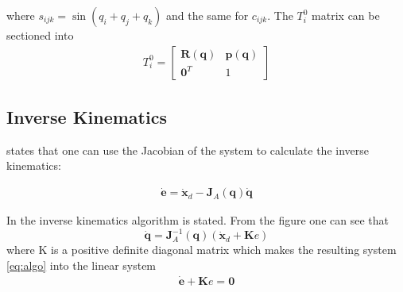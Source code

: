 where $s_{ijk} = \sin{(q_i + q_j + q_k)}$ and the same for $c_{ijk}$. The $T_i^0$ matrix can be sectioned into \begin{align*}
 T_i^0 = 
    \begin{bmatrix}
        \bm{R}(\bm{q}) & \bm{p}(\bm{q})\\
        \bm{0}^T & 1
    \end{bmatrix}    
\end{align*}

\subsection*{Inverse Kinematics}
\cite{Siciliano} states that one can use the Jacobian of the system to calculate the inverse kinematics:

\begin{align}\label{eq:algo}
\dot{\bm{e}} = \dot{\bm{x}}_d - \bm{J}_A(\bm{q})\dot{\bm{q}}
\end{align}

In  the inverse kinematics algorithm is stated. From the figure one can see that 
$$
\dot{\bm{q}} = \bm{J}_A^{-1}(\bm{q})(\dot{\bm{x}}_d + \bm{K}e)
$$
where K is a positive definite diagonal matrix which makes the resulting system \eqref{eq:algo} into the linear system
\begin{align*}
    \dot{\bm{e}} + \bm{K}e = \bm{0}
\end{align*}


